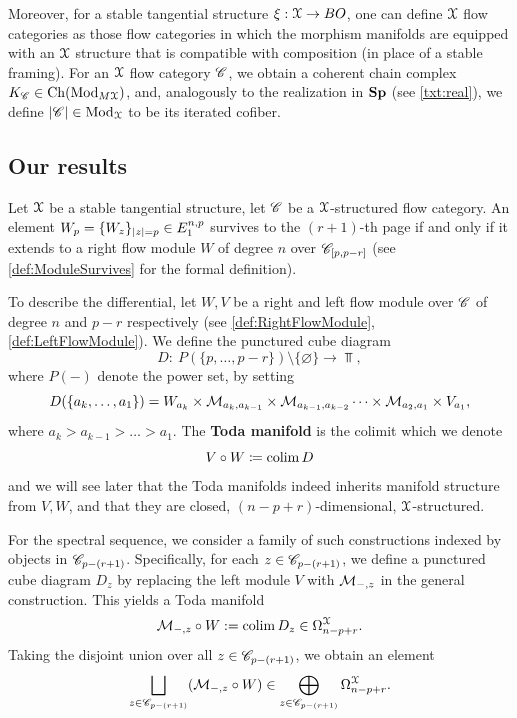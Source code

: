 Moreover, for a stable tangential structure $\xi: \EuScript{X} \to BO$, one can define $\EuScript{X}$ flow categories as those flow categories in which the morphism manifolds are equipped with an $\EuScript{X}$ structure that is compatible with composition (in place of a stable framing). For an $\EuScript{X}$ flow category $\mathscr{C}$, we obtain a coherent chain complex $K_{\mathscr{C}} \in \operatorname{Ch}(\operatorname{Mod}_{M\EuScript{X}})$, and, analogously to the realization in $\mathbf{Sp}$ (see \ref{txt:real}), we define $\left\lvert\mathscr{C}\right\rvert \in \operatorname{Mod}_{\EuScript{X}}$ to be its iterated cofiber.

\subsection*{Our results}
Let $\EuScript{X}$ be a stable tangential structure, let $\mathscr{C}$ be a $\EuScript{X}$-structured flow category.
An element $W_p = \{W_z\}_{\left\lvert z\right\rvert=p} \in E_{1}^{n,p}$ survives to the $(r+1)$-th page if and only if it extends to a right flow module $W$ of degree $n$ over $\mathscr{C}_{[p,p-r]}$ (see \cref{def:ModuleSurvives} for the formal definition).

To describe the differential, let $W,V$ be a right and left flow module over $\mathscr{C}$ of degree $n$ and $p-r$ respectively (see \cref{def:RightFlowModule}, \cref{def:LeftFlowModule}). We define the punctured cube diagram
\begin{equation*}
    D: \ P(\{p,\dots,p-r\}) \setminus \{\varnothing\} \to \Top,
\end{equation*}
where $P(-)$ denote the power set, by setting
\begin{equation*}
    D(\{a_k, \dots, a_1\}) = W_{a_k} \times \mathcal{M}_{a_k,a_{k-1}} \times \mathcal{M}_{a_{k-1},a_{k-2}} \dots \times \mathcal{M}_{a_2,a_1} \times V_{a_1},
\end{equation*}
where $a_k > a_{k-1} > \dots > a_1$.
The \textbf{Toda manifold} is the colimit which we denote
\begin{equation*}
    V \circ W \coloneqq \operatorname*{colim} D 
\end{equation*}
and we will see later that the Toda manifolds indeed inherits manifold structure from $V,W$, and that they are closed, $(n-p+r)$-dimensional, $\EuScript{X}$-structured.

For the spectral sequence, we consider a family of such constructions indexed by objects in $\mathscr{C}_{p-(r+1)}$. Specifically, for each $z \in \mathscr{C}_{p-(r+1)}$, we define a punctured cube diagram $D_z$ by replacing the left module $V$ with $\mathcal{M}_{-,z}$ in the general construction. This yields a Toda manifold
\begin{equation*}
    \mathcal{M}_{-,z} \circ W := \operatorname*{colim} D_z \in \Omega^{\EuScript{X}}_{n-p+r}.
\end{equation*}
Taking the disjoint union over all $z \in \mathscr{C}_{p-(r+1)}$, we obtain an element
\begin{equation*}
    \bigsqcup_{z \in \mathscr{C}_{p-(r+1)}} (\mathcal{M}_{-,z} \circ W) \in \bigoplus_{z \in \mathscr{C}_{p-(r+1)}} \Omega^{\EuScript{X}}_{n-p+r}.
\end{equation*}

